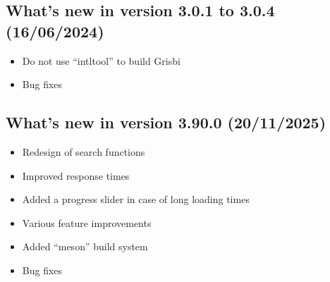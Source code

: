 \subsection{What's new in version 3.0.1 to 3.0.4 \textnormal{(16/06/2024)}}

\begin{itemize}
	\item Do not use \enquote{intltool} to build Grisbi
	\item Bug fixes
\end{itemize}

\subsection{What's new in version 3.90.0 \textnormal{(20/11/2025)}}

\begin{itemize}
	\item Redesign of search functions
	\item Improved response times
	\item Added a progress slider in case of long loading times
	\item Various feature improvements
	\item Added \enquote{meson} build system
	\item Bug fixes
\end{itemize}

